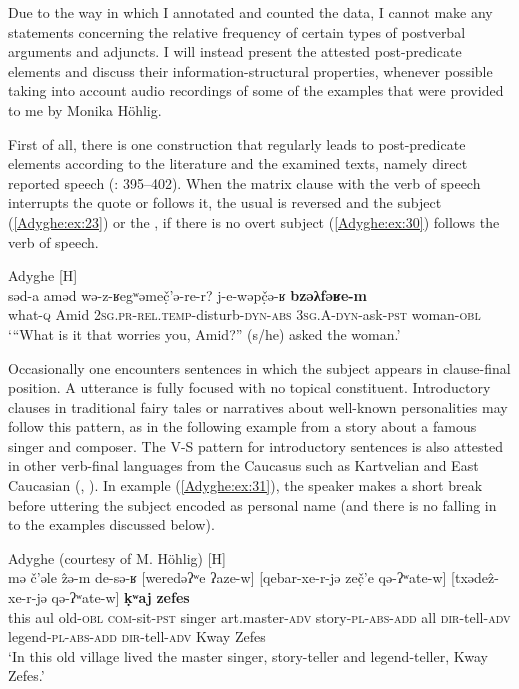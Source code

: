 \documentclass[output=paper,colorlinks,citecolor=brown, draft]{langscibook}
\begin{document}
Due to the way in which I annotated and counted the data, I cannot make any statements concerning the relative frequency of certain types of postverbal arguments and adjuncts. I will instead present the attested post-predicate elements and discuss their information-structural properties, whenever possible taking into account audio recordings of some of the examples that were provided to me by Monika Höhlig. 

First of all, there is one construction that regularly leads to post-predicate elements according to the literature and the examined texts, namely direct reported speech (\citealt{rogava1966grammatika}: 395--402). When the matrix clause with the verb of speech interrupts the quote or follows it, the usual  is reversed and the subject (\ref{Adyghe:ex:23}) or the , if there is no overt subject (\ref{Adyghe:ex:30}) follows the verb of speech.

\ea\label{Adyghe:ex:30}
Adyghe \citep[396]{rogava1966grammatika} [H] \\
\gll səd-a aməd wə-z-ʁegʷəmeč̣'ə-re-r? j-e-wəpč̣ə-ʁ \textbf{bzəλfəʁe-m} \\
what\textsc{-q} Amid \textsc{2sg.}\textsc{pr-}\textsc{rel.}\textsc{temp-}disturb\textsc{-dyn}\textsc{-abs} \textsc{3sg.A}\textsc{-dyn}-ask\textsc{-pst} woman\textsc{-obl} \\
\glt `{}``What is it that worries you, Amid?'' (s/he) asked the woman.' 
\z

Occasionally one encounters  sentences in which the subject appears in clause-final position. A  utterance is fully focused with no topical constituent. Introductory clauses in traditional fairy tales or narratives about well-known personalities may follow this pattern, as in the following example from a story about a famous singer and composer. The V-S pattern for introductory  sentences is also attested in other verb-final languages from the Caucasus such as Kartvelian and East Caucasian (\citealt{forker_information_2021}, ). In example (\ref{Adyghe:ex:31}), the speaker makes a short break before uttering the subject encoded as personal name (and there is no falling  in  to the examples discussed below).

\ea\label{Adyghe:ex:31}
Adyghe (courtesy of M. Höhlig) [H] \\
\gll mə č'əle ẑə-m de-sə-ʁ [weredəʔʷe ʔaze-w] [qebar-xe-r-jə zeč̣'e qə-ʔʷate-w] [txədeẑ-xe-r-jə qə-ʔʷate-w] \textbf{ḳʷaj} \textbf{zefes} \\
this aul old\textsc{-obl} \textsc{com-}sit\textsc{-pst} singer art.master\textsc{-adv} story\textsc{-pl}\textsc{-abs}\textsc{-add} all \textsc{dir-}tell\textsc{-adv} legend\textsc{-pl}\textsc{-abs}\textsc{-add} \textsc{dir-}tell\textsc{-adv} Kway Zefes \\
\glt `In this old village lived the master singer, story-teller and legend-teller, Kway Zefes.'
\z
\end{document}

